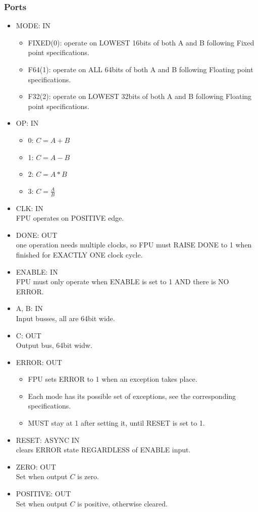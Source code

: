 \documentclass[12pt]{report}
\begin{document}
\subsubsection{Ports}
\begin{itemize}
    \item MODE: IN
    \begin{itemize}
        \item FIXED(0): operate on LOWEST 16bits of both A and B following Fixed point specifications.
        \item F64(1): operate on ALL 64bits of both A and B following Floating point specifications.
        \item F32(2): operate on LOWEST 32bits of both A and B following Floating point specifications.
    \end{itemize}
    \item OP: IN
    \begin{itemize}
        \item 0: $C = A + B$ 
        \item 1: $C = A - B$ 
        \item 2: $C = A * B$ 
        \item 3: $C = \frac{A}{B}$  
    \end{itemize}
    \item CLK: IN\\
        FPU operates on POSITIVE edge.
    \item DONE: OUT\\ 
    one operation needs multiple clocks, so FPU must RAISE DONE to 1 when finished for EXACTLY ONE clock cycle.
    \item ENABLE: IN\\
    FPU must only operate when ENABLE is set to 1 AND there is NO ERROR.
    \item A, B: IN\\
    Input busses, all are 64bit wide.
    \item C: OUT\\
    Output bus, 64bit widw.
    \item ERROR: OUT
    \begin{itemize}
        \item FPU sets ERROR to 1 when an exception takes place. 
        \item Each mode has its possible set of exceptions, see the corresponding specifications. 
        \item MUST stay at 1 after setting it, until RESET is set to 1.
    \end{itemize}
    \item RESET: ASYNC IN\\
    clears ERROR state REGARDLESS of ENABLE input.
    \item ZERO: OUT\\
    Set when output $C$ is zero.
    \item POSITIVE: OUT\\
    Set when output $C$ is positive, otherwise cleared.
\end{itemize}
\end{document}
